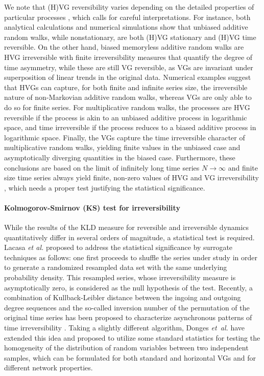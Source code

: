 		We note that (H)VG reversibility varies depending on the detailed properties of particular processes \cite{Lacasa2015,Telesca2018c}, which calls for careful interpretations. For instance, both analytical calculations and numerical simulations show that unbiased additive random walks, while nonstationary, are both (H)VG  stationary and (H)VG time reversible. On the other hand, biased memoryless additive random walks are HVG irreversible with finite irreversibility measures that quantify the degree of time asymmetry, while these are still VG reversible, as VGs are invariant under superposition of linear trends in the original data. Numerical examples suggest that HVGs can capture, for both finite and infinite series size, the irreversible nature of non-Markovian additive random walks, whereas VGs are only able to do so for finite series. For multiplicative random walks, the processes are HVG reversible if the process is akin to an unbiased additive process in logarithmic space, and time irreversible if the process reduces to a biased additive process in logarithmic space. Finally, the VGs capture the time irreversible character of multiplicative random walks, yielding finite values in the unbiased case and asymptotically diverging quantities in the biased case. Furthermore, these conclusions are based on the limit of infinitely long time series $N \to \infty$ and finite size time series always yield finite, non-zero values of HVG and VG irreversibility \cite{Xiong2018}, which needs a proper test justifying the statistical significance. 
		
		\paragraph{Kolmogorov-Smirnov (KS) test for irreversibility}
		While the results of the KLD measure for reversible and irreversible dynamics quantitatively differ in several orders of magnitude, a statistical test is required. Lacasa \textit{et al.} \cite{Lacasa2012} proposed to address the statistical significance by surrogate techniques as follows: one first proceeds to shuffle the series under study in order to generate a randomized resampled data set with the same underlying probability density. This resampled series, whose irreversibility measure is asymptotically zero, is considered as the null hypothesis of the test. Recently, a combination of Kullback-Leibler distance between the ingoing and outgoing degree sequences and the so-called inversion number of the permutation of the original time series has been proposed to characterize asynchronous patterns of time irreversibility \cite{Yang2018}. Taking a slightly different algorithm, Donges \textit{et~al.} \cite{Donner2012Nolta,Donges2013} have extended this idea and proposed to utilize some standard statistics for testing the homogeneity of the distribution of random variables between two independent samples, which can be formulated for both standard and horizontal VGs and for different network properties. 
		

